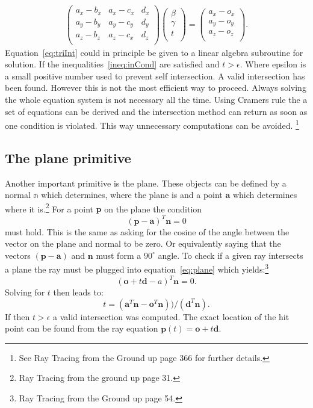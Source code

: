\begin{align}
\begin{pmatrix}
a_x - b_x & a_x - c_x & d_x \\
a_y - b_y & a_y - c_y & d_y \\
a_z - b_z & a_z - c_x & d_z \\
\end{pmatrix}
\begin{pmatrix}
\beta \\ \gamma \\ t \\
\end{pmatrix}
= 
\begin{pmatrix}
a_x - o_x \\
a_y - o_y \\
a_z - o_z \\
\end{pmatrix}.
\label{eq:triInt}
\end{align}
Equation~\ref{eq:triInt} could in principle be given to a linear algebra subroutine for solution. If the inequalities~\ref{ineq:inCond} are satisfied and $t > \epsilon$. Where epsilon is a small positive number used to prevent self intersection. A valid intersection has been found. However this
is not the most efficient way to proceed. Always solving the whole equation system is not necessary all the time.
Using Cramers rule the a set of equations can be derived and the intersection method can return as soon as one 
condition is violated. This way unnecessary computations can be avoided. \footnote{See Ray Tracing from the Ground up page 366 for further details.}

\subsection{The plane primitive}
Another important primitive is the plane. These objects can be defined by a normal $\mathbb{n}$ which determines, where
the plane is and a point $\mathbf{a}$ which determines where it is.\footnote{Ray Tracing from the ground up page 31.} 
For a point $\mathbf{p}$ on the plane the condition 
\begin{equation}
(\mathbf{p} - \mathbf{a})^T  \mathbf{n} = 0
\label{eq:plane}
\end{equation} 
must hold. This is the same as asking for the cosine of the angle between the vector on the plane and normal to be zero. Or equivalently saying that the vectors $(\mathbf{p} - \mathbf{a})$ and $\mathbf{n}$ must form a $90^{\circ}$ angle. To check if a given ray intersects a plane the ray must be plugged into equation~\ref{eq:plane} which yields:\footnote{Ray Tracing from the Ground up page 54.}
\begin{equation}
(\mathbf{o} + t\mathbf{d} - a)^T \mathbf{n} = 0.
\end{equation}
Solving for $t$ then leads to:
\begin{equation}
t = (\mathbf{a}^T\mathbf{n} -  \mathbf{o}^T\mathbf{n}) ) / (\mathbf{d}^T \mathbf{n}).
\end{equation}
If then $ t > \epsilon$ a valid intersection was computed. The exact location of the hit point can be found from the ray equation $\mathbf{p}(t) = \mathbf{o} + t\mathbf{d}$. 

